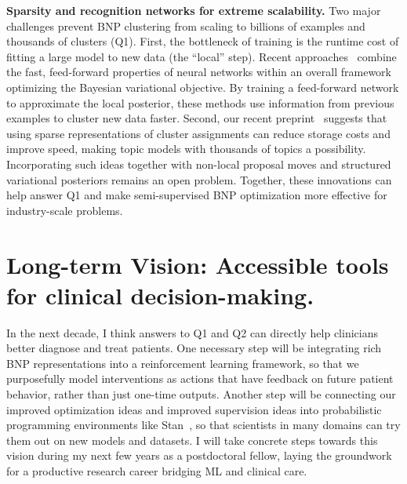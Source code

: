 \documentclass[11pt,letterpaper]{article}
\begin{document}
\textbf{Sparsity and recognition networks for extreme scalability.}
Two major challenges prevent BNP clustering from scaling to billions of examples and thousands of clusters (Q1). First, the bottleneck of training is the runtime cost of fitting a large model to new data (the ``local'' step). Recent approaches~\citep{gan2015deepTSBN,mnih2014neuralVariational} combine the fast, feed-forward properties of neural networks within an overall framework optimizing the Bayesian variational objective. By training a feed-forward network to approximate the local posterior, these methods use information from previous examples to cluster new data faster. 
Second, our recent preprint~\citep{hughes2016sparse} suggests that using sparse representations of cluster assignments can reduce storage costs and improve speed, making topic models with thousands of topics a possibility.
Incorporating such ideas together with non-local proposal moves and structured variational posteriors remains an open problem. Together, these innovations can help answer Q1 and make semi-supervised BNP optimization more effective for industry-scale problems.



\section{Long-term Vision: Accessible tools for clinical decision-making.}

In the next decade, I think answers to Q1 and Q2 can directly help clinicians better diagnose and treat patients.
One necessary step will be integrating rich BNP representations into a reinforcement learning framework, so that we purposefully model interventions as actions that have feedback on future patient behavior, rather than just one-time outputs.
Another step will be connecting our improved optimization ideas and improved supervision ideas into probabilistic programming environments like Stan~\citep{kucukelbir2015stan}, so that scientists in many domains can try them out on new models and datasets.
I will take concrete steps towards this vision during my next few years as a postdoctoral fellow, laying the groundwork for a productive research career bridging ML and clinical care.

{\scriptsize
\setlength{\bibsep}{1pt}

}
\end{document}
